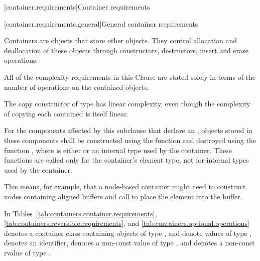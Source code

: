 [container.requirements]{Container requirements}%

[container.requirements.general]{General container requirements}

\pnum
Containers are objects that store other objects.
They control allocation and deallocation of these objects
through constructors, destructors, insert and erase operations.

\pnum
All of the complexity requirements in this Clause are stated solely
in terms of the number of operations on the contained objects.
\begin{example}
The copy constructor of type
has linear complexity,
even though the complexity of copying each contained
is itself linear.
\end{example}

\pnum
For the components affected by this subclause that declare an ,
objects stored in these components shall be constructed using the function
and destroyed using the function
,
where  is either  or
an internal type used by the container.
These functions are called only for the
container's element type, not for internal types used by the container. \begin{note} This
means, for example, that a node-based container might need to construct nodes containing
aligned buffers and call  to place the element into the buffer.
\end{note}

\pnum
In Tables~\ref{tab:containers.container.requirements},
\ref{tab:containers.reversible.requirements}, and
\ref{tab:containers.optional.operations}
 denotes a container class containing objects of type
,  and 
denote values of type , 
denotes an identifier,  denotes
a non-const value of type , and 
denotes a non-const rvalue of type .

